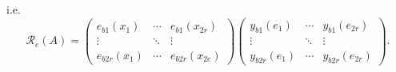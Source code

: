 \documentclass[aps,preprint]{revtex4}
\begin{document}
\begin{enumerate}
i.e. 
\begin{equation}
\mathcal{R}_{e}\left( A\right) =\left( 
\begin{array}{ccc}
e_{b1}\left( x_{1}\right) & \cdots & e_{b1}\left( x_{2r}\right) \\ 
\vdots & \ddots & \vdots \\ 
e_{b2r}\left( x_{1}\right) & \cdots & e_{b2r}\left( x_{2e}\right)%
\end{array}%
\right) \left( 
\begin{array}{ccc}
y_{b1}\left( e_{1}\right) & \cdots & y_{b1}\left( e_{2r}\right) \\ 
\vdots & \ddots & \vdots \\ 
y_{b2r}\left( e_{1}\right) & \cdots & y_{b2r}\left( e_{2r}\right)%
\end{array}%
\right) .
\end{equation}


\end{enumerate}
\end{document}
